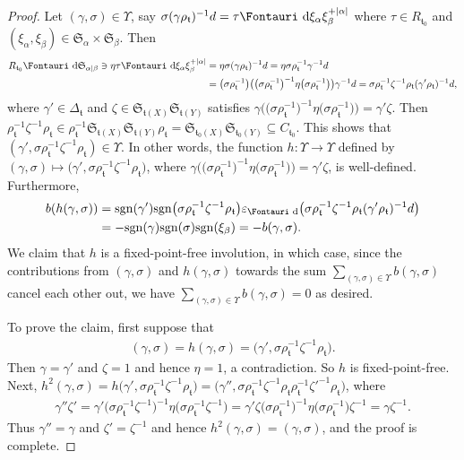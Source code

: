 \documentclass[pdftex]{sigma}
\renewcommand{\t}{\mathfrak{t}}
\newcommand{\sgn}{\mathrm{sgn}}
\newcommand{\sym}[1]{\mathfrak{S}_{#1}}
\newcommand{\dR}{\text{\Fontauri d}}
\newcommand{\e}{\varepsilon}
\newcommand{\tlxi}[2]{\xi_{#1}^{+#2}}
\begin{document}
\begin{proof}
Let $(\gamma, \sigma) \in \Upsilon$, say $\sigma (\gamma \rho_{\t})^{-1} d = \tau \dR \xi_\alpha \tlxi{\beta}{|\alpha|}$ where $\tau \in R_{\t_0}$ and $(\xi_\alpha,\xi_\beta) \in \sym{\alpha} \times \sym{\beta}$. Then
\begin{align*}
R_{\t_0} \dR \sym{\alpha|\beta} \ni \eta \tau \dR \xi_\alpha \tlxi{\beta}{|\alpha|} &=
\eta \sigma (\gamma \rho_{\t})^{-1} d = \eta \sigma \rho_{\t}^{-1} \gamma^{-1} d\\
&= \big(\sigma \rho_{\t}^{-1}\big) \big(\big(\sigma \rho_{\t}^{-1}\big)^{-1} \eta \big(\sigma \rho^{-1}_{\t} \big)\big) \gamma^{-1} d
= \sigma \rho_{\t}^{-1} \zeta^{-1} \rho_{\t} (\gamma'\rho_{\t})^{-1} d,
\end{align*}
where $\gamma' \in \Delta_{\t}$ and $\zeta \in \sym{\t(X)}\sym{\t(Y)}$ satisfies $\gamma \big(\big(\sigma \rho_{\t}^{-1}\big)^{-1} \eta \big(\sigma \rho^{-1}_{\t} \big)\big) = \gamma' \zeta$. Then $\rho_{\t}^{-1} \zeta^{-1} \rho_{\t} \in \rho_{\t}^{-1} \sym{\t(X)} \sym{\t(Y)} \rho_{\t} = \sym{\t_0(X)}\sym{\t_0(Y)} \subseteq C_{\t_0}$. This shows that $(\gamma',\sigma \rho_{\t}^{-1} \zeta^{-1} \rho_{\t}) \in \Upsilon$. In other words, the function $h \colon \Upsilon \to \Upsilon$ defined by $(\gamma,\sigma) \mapsto \big(\gamma',\sigma \rho_{\t}^{-1} \zeta^{-1} \rho_{\t}\big)$, where $\gamma \big(\big(\sigma \rho_{\t}^{-1}\big)^{-1} \eta \big(\sigma \rho^{-1}_{\t} \big)\big) = \gamma' \zeta$, is well-defined. Furthermore,
\begin{align*}
b(h(\gamma,\sigma)) &= \sgn(\gamma')\sgn\big(\sigma \rho_{\t}^{-1} \zeta^{-1} \rho_{\t} \big) \e_{\dR}\big(\sigma \rho_{\t}^{-1} \zeta^{-1} \rho_{\t} (\gamma'\rho_{\t})^{-1} d\big) \\
&= -\sgn(\gamma) \sgn(\sigma) \sgn(\xi_{\beta}) = -b(\gamma,\sigma).
\end{align*}
We claim that $h$ is a fixed-point-free involution, in which case, since the contributions from $(\gamma,\sigma)$ and $h(\gamma,\sigma)$ towards the sum $\sum\limits_{(\gamma,\sigma) \in \Upsilon} b(\gamma,\sigma)$ cancel each other out, we have $\sum\limits_{(\gamma,\sigma) \in \Upsilon} b(\gamma,\sigma) =0$ as desired.

To prove the claim, first suppose that
\begin{gather*}
(\gamma,\sigma) =h(\gamma,\sigma)=\big(\gamma',\sigma \rho_{\t}^{-1} \zeta^{-1} \rho_{\t}\big).\end{gather*}
Then $\gamma=\gamma'$ and $\zeta=1$ and hence $\eta=1$, a contradiction. So $h$ is fixed-point-free. Next, $h^2(\gamma,\sigma) = h\big(\gamma',\sigma \rho_{\t}^{-1} \zeta^{-1} \rho_{\t}\big) = \big(\gamma'', \sigma \rho_{\t}^{-1} \zeta^{-1} \rho_{\t} \rho_{\t}^{-1} \zeta'^{-1} \rho_{\t}\big)$, where
\begin{gather*}
\gamma''\zeta' = \gamma' \big(\sigma \rho_{\t}^{-1} \zeta^{-1}\big)^{-1} \eta \big(\sigma \rho_{\t}^{-1} \zeta^{-1}\big) =
\gamma' \zeta \big(\sigma \rho_{\t}^{-1}\big)^{-1} \eta \big(\sigma \rho_{\t}^{-1}\big) \zeta^{-1} = \gamma \zeta^{-1}.
\end{gather*}
Thus $\gamma'' = \gamma$ and $\zeta' = \zeta^{-1}$ and hence $h^2(\gamma,\sigma) = (\gamma, \sigma)$, and the proof is complete.
\end{proof}
\end{document}
